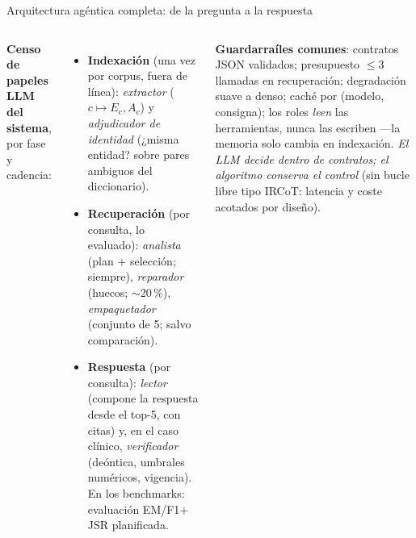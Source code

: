 \documentclass[aspectratio=169,10pt]{beamer}
\begin{document}
\begin{frame}{Arquitectura agéntica completa: de la pregunta a la respuesta}
\begin{columns}[T]
\scriptsize
\textbf{Censo de papeles LLM del sistema}, por fase y cadencia:
\begin{itemize}\scriptsize
\item \textbf{Indexación} (una vez por corpus, fuera de línea):
  \emph{extractor} ($c\mapsto E_c,A_c$) y \emph{adjudicador de identidad}
  (¿misma entidad? sobre pares ambiguos del diccionario).
\item \textbf{Recuperación} (por consulta, lo evaluado):
  \emph{analista} (plan $+$ selección; siempre),
  \emph{reparador} (huecos; $\sim$20\,\%),
  \emph{empaquetador} (conjunto de 5; salvo comparación).
\item \textbf{Respuesta} (por consulta):
  \emph{lector} (compone la respuesta desde el top-5, con citas) y, en el
  caso clínico, \emph{verificador} (deóntica, umbrales numéricos, vigencia).
  En los benchmarks: evaluación EM/F1$+$JSR planificada.
\end{itemize}
\textbf{Guardarraíles comunes}: contratos JSON validados; presupuesto
$\le 3$ llamadas en recuperación; degradación suave a denso; caché por
(modelo, consigna); los roles \emph{leen} las herramientas, nunca las
escriben ---la memoria solo cambia en indexación. \emph{El LLM decide
dentro de contratos; el algoritmo conserva el control} (sin bucle libre
tipo IRCoT: latencia y coste acotados por diseño).
\centering
{}
\end{columns}
\end{frame}
\end{document}
